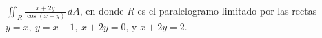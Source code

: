 \item $\iint_R \frac{x + 2y}{\cos(x - y)} \, dA$, en donde $R$ es el paralelogramo limitado por las rectas $y = x, \ y = x - 1, \ x + 2y = 0$, y $x + 2y = 2$.

